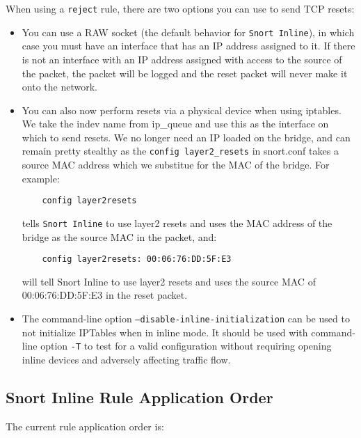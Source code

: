 \documentclass[english]{report}
\begin{document}
When using a \texttt{reject} rule, there are two options you can use to send
TCP resets:

\begin{itemize}

\item You can use a RAW socket (the default behavior for \texttt{Snort
Inline}), in which case you must have an interface that has an IP address
assigned to it. If there is not an interface with an IP address assigned with
access to the source of the packet, the packet will be logged and the reset
packet will never make it onto the network.

\item You can also now perform resets via a physical device when using
iptables.  We take the indev name from ip\_queue and use this as the interface
on which to send resets. We no longer need an IP loaded on the bridge, and can
remain pretty stealthy as the \texttt{config layer2\_resets} in
snort.conf takes a source MAC address which we substitue for the MAC of
the bridge. For example:

\begin{verbatim}
    config layer2resets
\end{verbatim}

tells \texttt{Snort Inline} to use layer2 resets and uses the MAC address of
the bridge as the source MAC in the packet, and:

\begin{verbatim}
    config layer2resets: 00:06:76:DD:5F:E3  
\end{verbatim}

will tell Snort Inline to use layer2 resets and uses the source MAC of
00:06:76:DD:5F:E3 in the reset packet.

\item The command-line option \texttt{--disable-inline-initialization} can be
used to not initialize IPTables when in inline mode.  It should be used with
command-line option \texttt{-T} to test for a valid configuration without
requiring opening inline devices and adversely affecting traffic flow.

\end{itemize}

\subsection{Snort Inline Rule Application Order}
\label{InlineRuleOrder}

The current rule application order is: 
\end{document}
